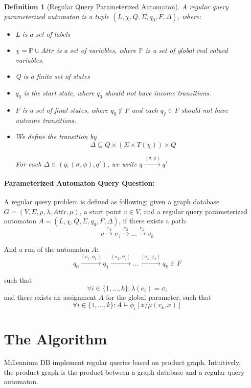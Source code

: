 \documentclass{article}
\newtheorem{definition}{Definition}
\begin{document}
\begin{definition}[Regular Query Parameterized Automaton]
A regular query parameterized automaton is a tuple $(L, \chi, Q, \Sigma, q_0, F, \Delta)$, where: 
\begin{itemize}
    \item L is a set of labels 
    \item $\chi = \mathbb{P} \cup Attr$ is a set of variables, where $\mathbb{P}$ is a set of global real valued variables.
    \item Q is a finite set of states 
    \item $q_0$ is the start state, where $q_0$ should not have income transitions. 
    \item $F$ is a set of final states, where $q_0 \notin F$ and each $q_f \in F$ should not have outcome transitions. 
    \item We define the transition by
    \[\Delta \subseteq Q \times (\Sigma \times T(\chi)) \times Q\] 
    
    For each $\Delta \in (q, (\sigma, \phi), q')$,  we write $q \xrightarrow{\left( \sigma, \phi \right)} q'$

\end{itemize}


\end{definition}
\paragraph{Parameterized Automaton Query Question:} A regular query problem is defined as following: given a graph database $G = (V, E, \rho, \lambda, Attr, \mu)$, 
a start point $v \in V$, and a regular query parameterized automaton $A = (L, \chi, Q, \Sigma, q_0, F, \Delta) $, if there exists a path:
\[
v \xrightarrow{e_1} v_1 \xrightarrow{e_2} \dots \xrightarrow{e_{k}} v_k 
\]

And a run of the automaton $A$:
\[
q_0 \xrightarrow{(\sigma_1, \phi_1)} q_1 \xrightarrow{(\sigma_2, \phi_2)} \dots \xrightarrow{(\sigma_{k}, \phi_{k})} q_k \in F
\]

such that 
\[
\forall i \in \{1, \dots, k\}: \lambda(e_i) = \sigma_i 
\]
and there exists an assignment $A$ for the global parameter, such that 
\[
\forall i \in  \{1, \dots, k\}: A \models \phi_i [x/\mu(v_k, x)]
\]

\section*{The Algorithm}
Millennium DB implement regular queries based on product graph. Intuitively, the product graph is the product between a graph database and a regular query automaton.
\end{document}
